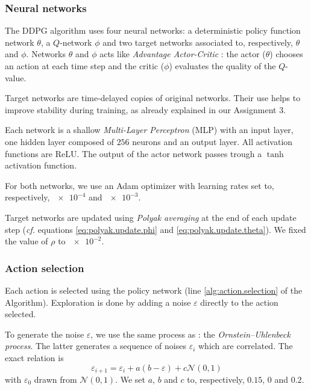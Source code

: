 \documentclass[a4paper, 12pt]{article}
\begin{document}
    \subsubsection{Neural networks}
    
    The DDPG algorithm uses four neural networks: a deterministic policy function network $\theta$, a $Q$-network $\phi$ and two target networks associated to, respectively, $\theta$ and $\phi$. Networks $\theta$ and $\phi$ acts like \emph{Advantage Actor-Critic} \cite{sutton2018reinforcement}: the actor ($\theta$) chooses an action at each time step and the critic ($\phi$) evaluates the quality of the $Q$-value.
    
    Target networks are time-delayed copies of original networks. Their use helps to improve stability during training, as already explained in our Assignment 3.
    
    Each network is a shallow \emph{Multi-Layer Perceptron} (MLP) with an input layer, one hidden layer composed of $256$ neurons and an output layer. All activation functions are ReLU. The output of the actor network passes trough a $\tanh$ activation function.
    
    For both networks, we use an Adam \cite{kingma2014adam} optimizer with learning rates set to, respectively, $\num{e-4}$ and $\num{e-3}$.
    
    Target networks are updated using \emph{Polyak averaging} \cite{polyak1992acceleration} at the end of each update step (\emph{cf.} equations \ref{eq:polyak.update.phi} and \ref{eq:polyak.update.theta}). We fixed the value of $\rho$ to $\num{e-2}$.
    
    \subsubsection{Action selection}
    
    Each action is selected using the policy network (line \ref{alg:action.selection} of the Algorithm). Exploration is done by adding a noise $\varepsilon$ directly to the action selected.
    
    To generate the noise $\varepsilon$, we use the same process as \textcite{lillicrap2015continuous}: the \emph{Ornstein–Uhlenbeck process}. The latter generates a sequence of noises $\varepsilon_i$ which are correlated. The exact relation is
    \begin{equation}\label{eq:orstein-uhlenbeck}
        \varepsilon_{i+1} = \varepsilon_i + a(b - \varepsilon) + c \mathcal{N}(0, 1)
    \end{equation}
    with $\varepsilon_0$ drawn from $\mathcal{N}(0, 1)$. We set $a$, $b$ and $c$ to, respectively, $\num{0.15}$, $\num{0}$ and $\num{0.2}$.
    
\end{document}
